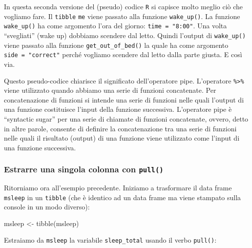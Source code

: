 \documentclass[
  10pt,
  italian,
  a4paper,
  extrafontsizes,onecolumn,openright
  ]{memoir}
\newenvironment{Shaded}{\begin{snugshade}}{\end{snugshade}}
\newcommand{\FunctionTok}[1]{\textcolor[rgb]{0.00,0.00,0.00}{#1}}
\newcommand{\NormalTok}[1]{#1}
\newcommand{\OtherTok}[1]{\textcolor[rgb]{0.56,0.35,0.01}{#1}}
\begin{document}
In questa seconda versione del (pseudo) codice \texttt{R} si capisce molto meglio ciò che vogliamo fare. Il \texttt{tibble} \texttt{me} viene passato alla funzione \texttt{wake\_up()}. La funzione \texttt{wake\_up()} ha come argomento l'ora del giorno: \texttt{time\ =\ "8:00"}. Una volta ``svegliati'' (wake up) dobbiamo scendere dal letto. Quindi l'output di \texttt{wake\_up()} viene passato alla funzione \texttt{get\_out\_of\_bed()} la quale ha come argomento \texttt{side\ =\ "correct"} perché vogliamo scendere dal letto dalla parte giusta. E così via.

Questo pseudo-codice chiarisce il significato dell'operatore pipe. L'operatore \texttt{\%\textgreater{}\%} viene utilizzato quando abbiamo una serie di funzioni concatenate. Per concatenazione di funzioni si intende una serie di funzioni nelle quali l'output di una funzione costituisce l'input della funzione successiva. L'operatore pipe è ``syntactic sugar'' per una serie di chiamate di funzioni concatenate, ovvero, detto in altre parole, consente di definire la concatenazione tra una serie di funzioni nelle quali il risultato (output) di una funzione viene utilizzato come l'input di una funzione successiva.

\hypertarget{estrarre-una-singola-colonna-con-pull}{%
\subsubsection{\texorpdfstring{Estrarre una singola colonna con \texttt{pull()}}{Estrarre una singola colonna con pull()}}\label{estrarre-una-singola-colonna-con-pull}}

Ritorniamo ora all'esempio precedente. Iniziamo a trasformare il data frame \texttt{msleep} in un \texttt{tibble} (che è identico ad un data frame ma viene stampato sulla console in un modo diverso):

\begin{Shaded}
\begin{Highlighting}[]
\NormalTok{msleep }\OtherTok{\textless{}{-}} \FunctionTok{tibble}\NormalTok{(msleep)}
\end{Highlighting}
\end{Shaded}

\noindent 
Estraiamo da \texttt{msleep} la variabile \texttt{sleep\_total} usando il verbo \texttt{pull()}:
\end{document}
